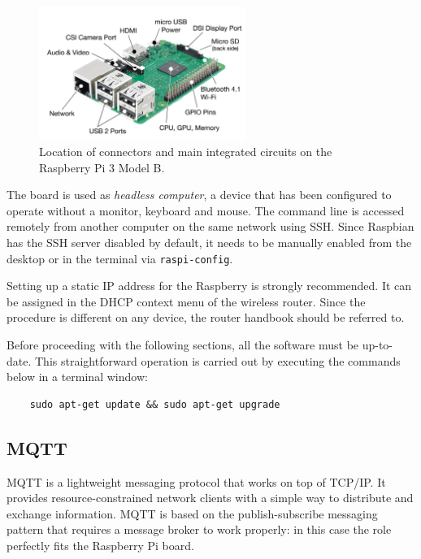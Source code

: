 \begin{figure}[H]
	\begin{center}
		\includegraphics[width=0.6\textwidth]{./pictures/rpi_connections.png}
		\caption{Location of connectors and main integrated circuits on the Raspberry Pi 3 Model B.}
		\label{rpi_connections}
	\end{center}
\end{figure}

\noindent
The board is used as \textit{headless computer}, a device that has been configured to operate without a monitor, keyboard and mouse. The command line is accessed remotely from another computer on the same network using SSH. Since Raspbian has the SSH server disabled by default, it needs to be manually enabled from the desktop or in the terminal via \texttt{raspi-config}.

Setting up a static IP address for the Raspberry is strongly recommended. It can be assigned in the DHCP context menu of the wireless router. Since the procedure is different on any device, the router handbook should be referred to.

Before proceeding with the following sections, all the software must be up-to-date. This straightforward operation is carried out by executing the commands below in a terminal window:

\begin{verbatim}
    sudo apt-get update && sudo apt-get upgrade
\end{verbatim}

\subsection{MQTT}
MQTT is a lightweight messaging protocol that works on top of TCP/IP. It provides resource-constrained network clients with a simple way to distribute and exchange information. MQTT is based on the publish-subscribe messaging pattern that requires a message broker to work properly: in this case the role perfectly fits the Raspberry Pi board.

